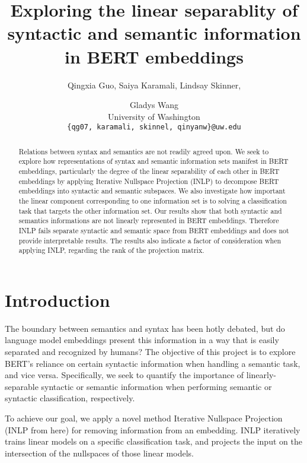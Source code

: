 \documentclass[11pt,a4paper]{article}
\title{Exploring the linear separablity of syntactic and semantic information in BERT embeddings }
\author{Qingxia Guo, Saiya Karamali, Lindsay Skinner, \and Gladys Wang
 \\ University of Washington \\ 
\texttt{\{qg07, karamali, skinnel, qinyanw\}@uw.edu}\\ 
}
\date{}
\begin{document}
\maketitle

\begin{abstract}
Relations between syntax and semantics are not readily agreed upon. We seek to explore how representations of syntax and semantic information sets manifest in BERT embeddings, particularly the degree of the linear separability of each other in BERT embeddings by applying Iterative Nullspace Projection (INLP) to decompose BERT embeddings into syntactic and semantic subspaces. We also investigate how important the linear component corresponding to one information set is to solving a classification task that targets the other information set. Our results show that both syntactic and semantics informations are not linearly represented in BERT embeddings. Therefore INLP fails separate syntactic and semantic space from BERT embeddings and does not provide interpretable results. The results also indicate a factor of consideration when applying INLP, regarding the rank of the projection matrix.
\end{abstract}



\section{Introduction}
\label{sec:introduction}


The boundary between semantics and syntax has been hotly debated, but do language model embeddings present this information in a way that is easily separated and recognized by humans? The objective of this project is to explore BERT\rq s \citep{bert} reliance on certain syntactic information when handling a semantic task, and vice versa. Specifically, we seek to quantify the importance of linearly-separable syntactic or semantic information when performing semantic or syntactic classification, respectively.

To achieve our goal, we apply a novel method Iterative Nullspace Projection (INLP from here) \citep{inlp}for removing information from an embedding. INLP iteratively trains linear models on a specific classification task, and projects the input on the intersection of the nullspaces of those linear models. 
\end{document}

